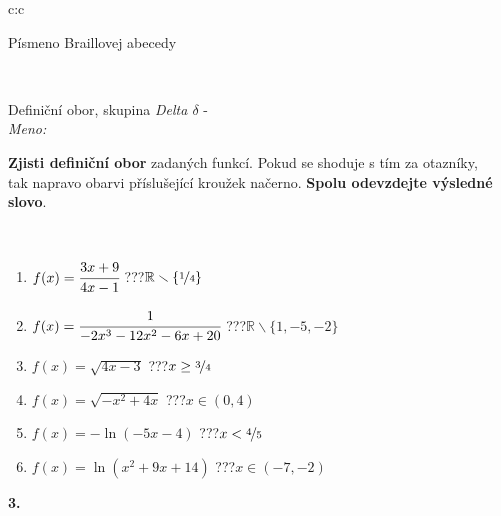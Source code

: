 \documentclass[10pt]{report}
\begin{document}
\begin{tabular}{c:c}
\begin{minipage}[c][104.5mm][t]{0.5\linewidth}
\begin{center}
\begin{minipage}{0.20\linewidth}
\begin{center}
{\small Písmeno Braillovej abecedy}
\end{center}
\end{minipage}
\end{center}
\end{minipage}
\\ \hdashline
\begin{minipage}[c][104.5mm][t]{0.5\linewidth}
\begin{center}
\vspace{7mm}
{\huge Definiční obor, skupina \textit{Delta $\delta$} -}\\[5mm]
\textit{Meno:}\phantom{xxxxxxxxxxxxxxxxxxxxxxxxxxxxxxxxxxxxxxxxxxxxxxxxxxxxxxxxxxxxxxxxx}\\[5mm]
\begin{minipage}{0.95\linewidth}
\textbf{Zjisti definiční obor} zadaných funkcí. Pokud se shoduje s tím za otazníky,\\tak napravo obarvi příslušející kroužek načerno. \textbf{Spolu odevzdejte výsledné slovo}.
\end{minipage}
\\[1mm]
\begin{minipage}{0.79\linewidth}
\begin{center}
\begin{varwidth}{\linewidth}
\begin{enumerate}
\normalsizerrr
\item $f(x)=\cfrac{3x+9}{4x-1}$\quad \dotfill\; ???\;\dotfill \quad $\mathbb{R}\smallsetminus\{\nicefrac{1}{4}\}$
\item $f(x)=\cfrac{1}{-2x^3-12x^2-6x+20}$\quad \dotfill\; ???\;\dotfill \quad $\mathbb{R}\smallsetminus\{1,-5,-2\}$
\item $f(x)=\sqrt{4x-3}$\quad \dotfill\; ???\;\dotfill \quad $x\geq\nicefrac{3}{4}$
\item $f(x)=\sqrt{-x^2+4x}$\quad \dotfill\; ???\;\dotfill \quad $x\in(0 , 4)$
\item $f(x)=-\ln{(-5x-4)}$\quad \dotfill\; ???\;\dotfill \quad $x<\nicefrac{4}{5}$
\item $f(x)=\ln{(x^2+9x+14)}$\quad \dotfill\; ???\;\dotfill \quad $x\in(-7 , -2)$
\end{enumerate}
\end{varwidth}
\end{center}
\end{minipage}
\begin{minipage}{0.20\linewidth}
\begin{center}
{\Huge\bfseries 3.} \\[2mm]

\end{center}
\end{minipage}
\end{center}
\end{minipage}
\end{tabular}
\end{document}
